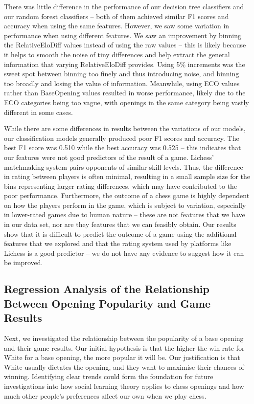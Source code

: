 \documentclass[a4paper, 11pt]{article}
\begin{document}
There was little difference in the performance of our decision tree classifiers and our random forest classifiers -- both of them achieved similar F1 scores and accuracy when using the same features. However, we saw some variation in performance when using different features. We saw an improvement by binning the RelativeEloDiff values instead of using the raw values -- this is likely because it helps to smooth the noise of tiny differences and help extract the general information that varying RelativeEloDiff provides. Using 5\% increments was the sweet spot between binning too finely and thus introducing noise, and binning too broadly and losing the value of information. Meanwhile, using ECO values rather than BaseOpening values resulted in worse performance, likely due to the ECO categories being too vague, with openings in the same category being vastly different in some cases.

While there are some differences in results between the variations of our models, our classification models generally produced poor F1 scores and accuracy. The best F1 score was 0.510 while the best accuracy was 0.525 -- this indicates that our features were not good predictors of the result of a game. Lichess' matchmaking system pairs opponents of similar skill levels. Thus, the difference in rating between players is often minimal, resulting in a small sample size for the bins representing larger rating differences, which may have contributed to the poor performance. Furthermore, the outcome of a chess game is highly dependent on how the players perform in the game, which is subject to variation, especially in lower-rated games due to human nature -- these are not features that we have in our data set, nor are they features that we can feasibly obtain. Our results show that it is difficult to predict the outcome of a game using the additional features that we explored and that the rating system used by platforms like Lichess is a good predictor -- we do not have any evidence to suggest how it can be improved.

\subsection{Regression Analysis of the Relationship Between Opening Popularity and Game Results}
Next, we investigated the relationship between the popularity of a base opening and their game results. Our initial hypothesis is that the higher the win rate for White for a base opening, the more popular it will be. Our justification is that White usually dictates the opening, and they want to maximise their chances of winning. Identifying clear trends could form the foundation for future investigations into how social learning theory applies to chess openings and how much other people's preferences affect our own when we play chess.
\end{document}
